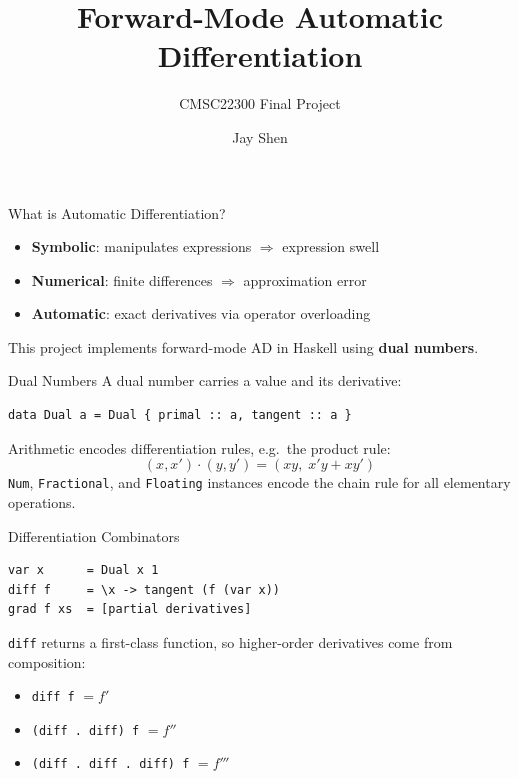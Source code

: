 \documentclass{beamer}
\title{Forward-Mode Automatic Differentiation}
\subtitle{CMSC22300 Final Project}
\author{Jay Shen}
\date{}
\begin{document}
\begin{frame}
\titlepage
\end{frame}

\begin{frame}{What is Automatic Differentiation?}
\begin{itemize}
  \item \textbf{Symbolic}: manipulates expressions $\Rightarrow$ expression swell
  \item \textbf{Numerical}: finite differences $\Rightarrow$ approximation error
  \item \textbf{Automatic}: exact derivatives via operator overloading
\end{itemize}
\vspace{1em}
This project implements forward-mode AD in Haskell using \textbf{dual numbers}.
\end{frame}

\begin{frame}[fragile]{Dual Numbers}
A dual number carries a value and its derivative:
\begin{verbatim}
data Dual a = Dual { primal :: a, tangent :: a }
\end{verbatim}
\vspace{0.5em}
Arithmetic encodes differentiation rules, e.g.\ the product rule:
\[
(x, x') \cdot (y, y') = (xy,\; x'y + xy')
\]
\vspace{0.5em}
\texttt{Num}, \texttt{Fractional}, and \texttt{Floating} instances encode the chain rule for all elementary operations.
\end{frame}

\begin{frame}[fragile]{Differentiation Combinators}
\begin{verbatim}
var x      = Dual x 1
diff f     = \x -> tangent (f (var x))
grad f xs  = [partial derivatives]
\end{verbatim}
\vspace{0.5em}
\texttt{diff} returns a first-class function, so higher-order derivatives come from composition:
\begin{itemize}
  \item \texttt{diff f} $= f'$
  \item \texttt{(diff . diff) f} $= f''$
  \item \texttt{(diff . diff . diff) f} $= f'''$
\end{itemize}
\end{frame}
\end{document}
